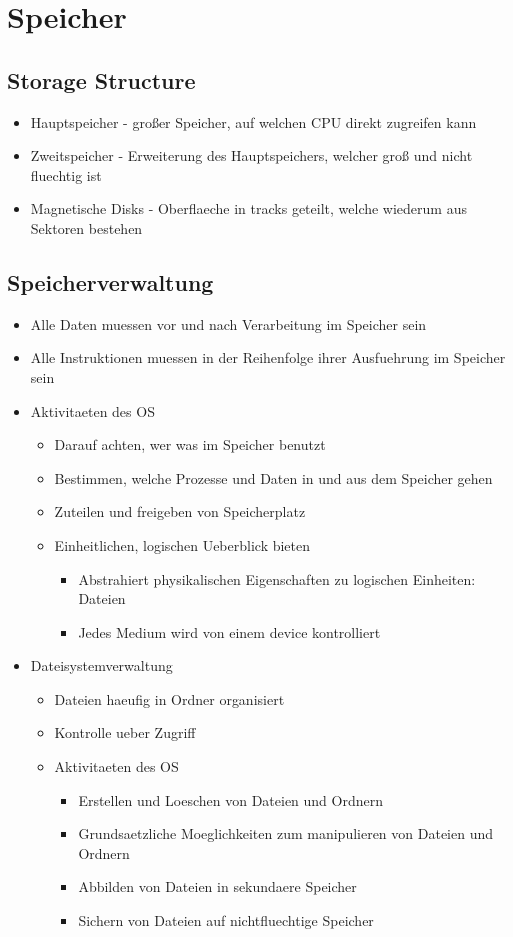 \documentclass[a4paper]{scrreprt}
\begin{document}
\section{Speicher}
\subsection{Storage Structure}
\begin{itemize}
	\item Hauptspeicher - großer Speicher, auf welchen CPU direkt zugreifen kann
	\item Zweitspeicher - Erweiterung des Hauptspeichers, welcher groß und nicht fluechtig ist
	\item Magnetische Disks - Oberflaeche in tracks geteilt, welche wiederum aus Sektoren bestehen
\end{itemize}

\subsection{Speicherverwaltung}
\begin{itemize}
	\item Alle Daten muessen vor und nach Verarbeitung im Speicher sein
	\item Alle Instruktionen muessen in der Reihenfolge ihrer Ausfuehrung im Speicher sein
	\item Aktivitaeten des OS
		\begin{itemize}
			\item Darauf achten, wer was im Speicher benutzt
			\item Bestimmen, welche Prozesse und Daten in und aus dem Speicher gehen
			\item Zuteilen und freigeben von Speicherplatz
			\item Einheitlichen, logischen Ueberblick bieten
				\begin{itemize}
					\item Abstrahiert physikalischen Eigenschaften zu logischen Einheiten: Dateien
					\item Jedes Medium wird von einem device kontrolliert
				\end{itemize}
		\end{itemize}
	\item Dateisystemverwaltung
		\begin{itemize}
			\item Dateien haeufig in Ordner organisiert
			\item Kontrolle ueber Zugriff
			\item Aktivitaeten des OS
				\begin{itemize}
					\item Erstellen und Loeschen von Dateien und Ordnern
					\item Grundsaetzliche Moeglichkeiten zum manipulieren von Dateien und Ordnern
					\item Abbilden von Dateien in sekundaere Speicher
					\item Sichern von Dateien auf nichtfluechtige Speicher
				\end{itemize}
		\end{itemize}
\end{itemize}
\end{document}
